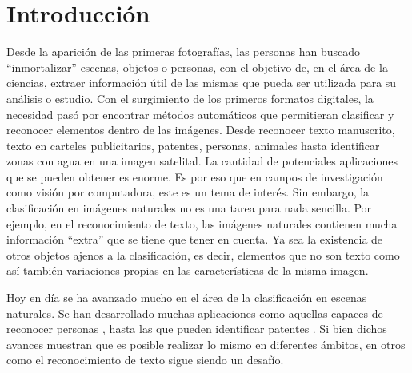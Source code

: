\newpage
\section{Introducción}

	Desde la aparición de las primeras fotografías, las personas han buscado ``inmortalizar'' escenas, objetos o personas, con el objetivo de, en el área de la ciencias, extraer información útil de las mismas que pueda ser utilizada para su análisis o estudio. Con el surgimiento de los primeros formatos digitales, la necesidad pasó por encontrar métodos automáticos que permitieran clasificar y reconocer elementos dentro de las imágenes. Desde reconocer texto manuscrito, texto en carteles publicitarios, patentes, personas, animales hasta identificar zonas con agua en una imagen satelital. La cantidad de potenciales aplicaciones que se pueden obtener es enorme. Es por eso que en campos de investigación como visión por computadora, este es un tema de interés. Sin embargo, la clasificación en imágenes naturales no es una tarea para nada sencilla. Por ejemplo, en el reconocimiento de texto, las imágenes naturales contienen mucha información ``extra'' que se tiene que tener en cuenta. Ya sea la existencia de otros objetos ajenos a la clasificación, es decir, elementos que no son texto como así también variaciones propias en las características de la misma imagen.
	
	Hoy en día se ha avanzado mucho en el área de la clasificación en escenas naturales. Se han desarrollado muchas aplicaciones como aquellas capaces de reconocer personas \cite{DT05}, hasta las que pueden identificar patentes \cite{DAB}. Si bien dichos avances muestran que es posible realizar lo mismo en diferentes ámbitos, en otros como el reconocimiento de texto sigue siendo un desafío.
	
	
	
	

	
	
	
	
	

